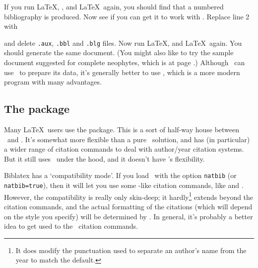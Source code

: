 If you run \LaTeX, \bibtex, and \LaTeX\ again, you should find that a
numbered bibliography is produced. Now see if you can get it to work
with . Replace line 2 with
\begin{center}
\end{center}
and delete \verb|.aux|, \verb|.bbl| and \verb|.blg| files. Now run
\LaTeX,  and \LaTeX\ again. You should generate the
same document. (You might also like to try the sample document
suggested for complete neophytes, which is at page
\pageref{neophyte:example}.) Although \biblatex\ can use \bibtex\ to
prepare its data, it's generally better to use , which
is a more modern program with many advantages.

\subsection{The  package}

Many \LaTeX\ users use the  package. This is a sort of
half-way house between \bibtex\ and \biblatex. It's somewhat more
flexible than a pure \bibtex\ solution, and has (in particular) a
wider range of citation commands to deal with author\slash year
citation systems. But it still uses \bibtex\ under the hood, and it
doesn't have \biblatex's flexibility.

Biblatex has a  `compatibility mode'.
If you load \biblatex\ with the option \texttt{natbib} (or
\texttt{natbib\allowbreak =\allowbreak true}), then it will let you
use some -like citation commands, like  and
. However, the compatibility is really only skin-deep;
it hardly\footnote{It does modify the punctuation used to separate an
author's name from the year to match the  default.}
extends beyond the citation commands, and the actual formatting of the
citations (which will depend on the style you specify) will be
determined by \biblatex. In general, it's probably a better idea to
get used to the \biblatex\ citation commands.
